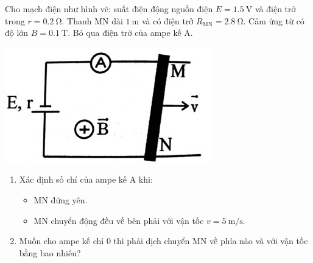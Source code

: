 \begin{ex}
	Cho mạch điện như hình vẽ: suất điện động nguồn điện $E=\SI{1.5}{\volt}$ và điện trở trong $r=\SI{0.2}{\ohm}$. Thanh MN dài $\SI{1}{\meter}$ và có điện trở $R_{\text{MN}}=\SI{2.8}{\ohm}$. Cảm ứng từ có độ lớn $B=\SI{0.1}{\tesla}$. Bỏ qua điện trở của ampe kế A.
	\begin{center}
		\includegraphics[width=0.25\linewidth]{figs/VN12-Y24-PH-SYL-022P-9}
	\end{center}
	\begin{enumerate}[label=\alph*)]
		\item Xác định số chỉ của ampe kế A khi:
		\begin{itemize}
			\item MN đứng yên.
			\item MN chuyển động đều về bên phải với vận tốc $v=\SI{5}{\meter/\second}$.
		\end{itemize}
		\item Muốn cho ampe kế chỉ 0 thì phải dịch chuyển MN về phía nào và với vận tốc bằng bao nhiêu?
	\end{enumerate}
	
\end{ex}





